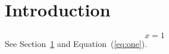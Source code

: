 \documentclass{rawlabelclass}
\begin{document}
\section{Introduction}\label{sec:intro}
\begin{equation}x=1\label{eq:one}\end{equation}
See Section~\ref{sec:intro} and Equation~(\ref{eq:one}).
\end{document}

